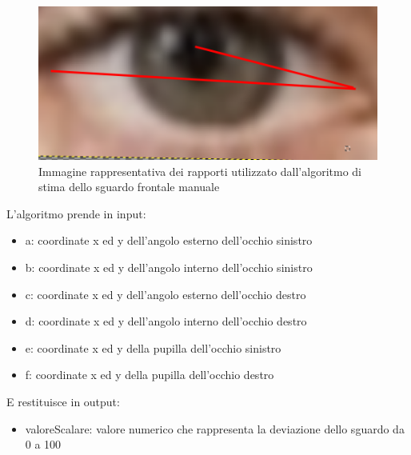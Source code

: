 \documentclass[12pt,a4paper,openright,twoside]{book}
\begin{document}
\begin{figure}
    \centering
    \includegraphics[width=.4\linewidth]{figures/frontal_gaze_manual.png}
    \caption{Immagine rappresentativa dei rapporti utilizzato dall'algoritmo di stima dello sguardo frontale manuale}
    \label{fig:frontal-gaze-manual}
\end{figure}
L'algoritmo prende in input:
\begin{itemize}
    \item a: coordinate x ed y dell'angolo esterno dell'occhio sinistro
    \item b: coordinate x ed y dell'angolo interno dell'occhio sinistro
    \item c: coordinate x ed y dell'angolo esterno dell'occhio destro
    \item d: coordinate x ed y dell'angolo interno dell'occhio destro
    \item e: coordinate x ed y della pupilla dell'occhio sinistro
    \item f: coordinate x ed y della pupilla dell'occhio destro
\end{itemize}
E restituisce in output:
\begin{itemize}
    \item valoreScalare: valore numerico che rappresenta la deviazione dello sguardo da 0 a 100
\end{itemize}
\end{document}
